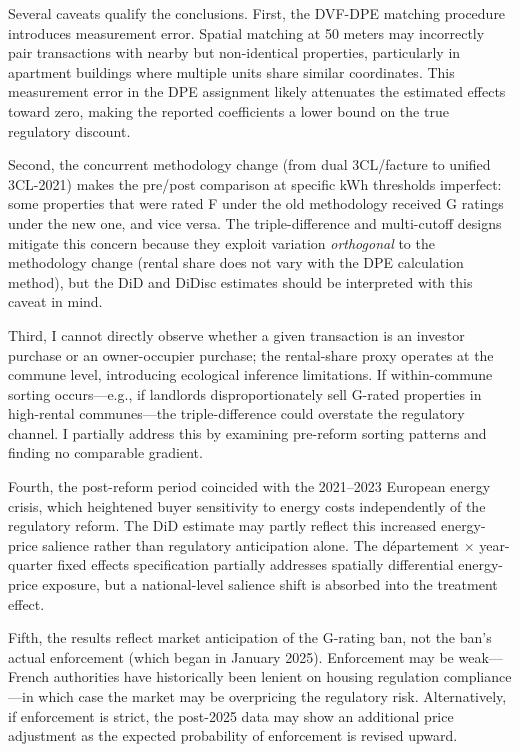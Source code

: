 \documentclass[12pt]{article}
\begin{document}
Several caveats qualify the conclusions. First, the DVF-DPE matching procedure introduces measurement error. Spatial matching at 50 meters may incorrectly pair transactions with nearby but non-identical properties, particularly in apartment buildings where multiple units share similar coordinates. This measurement error in the DPE assignment likely attenuates the estimated effects toward zero, making the reported coefficients a lower bound on the true regulatory discount.

Second, the concurrent methodology change (from dual 3CL/facture to unified 3CL-2021) makes the pre/post comparison at specific kWh thresholds imperfect: some properties that were rated F under the old methodology received G ratings under the new one, and vice versa. The triple-difference and multi-cutoff designs mitigate this concern because they exploit variation \textit{orthogonal} to the methodology change (rental share does not vary with the DPE calculation method), but the DiD and DiDisc estimates should be interpreted with this caveat in mind.

Third, I cannot directly observe whether a given transaction is an investor purchase or an owner-occupier purchase; the rental-share proxy operates at the commune level, introducing ecological inference limitations. If within-commune sorting occurs---e.g., if landlords disproportionately sell G-rated properties in high-rental communes---the triple-difference could overstate the regulatory channel. I partially address this by examining pre-reform sorting patterns and finding no comparable gradient.

Fourth, the post-reform period coincided with the 2021--2023 European energy crisis, which heightened buyer sensitivity to energy costs independently of the regulatory reform. The DiD estimate may partly reflect this increased energy-price salience rather than regulatory anticipation alone. The d\'epartement $\times$ year-quarter fixed effects specification partially addresses spatially differential energy-price exposure, but a national-level salience shift is absorbed into the treatment effect.

Fifth, the results reflect market anticipation of the G-rating ban, not the ban's actual enforcement (which began in January 2025). Enforcement may be weak---French authorities have historically been lenient on housing regulation compliance---in which case the market may be overpricing the regulatory risk. Alternatively, if enforcement is strict, the post-2025 data may show an additional price adjustment as the expected probability of enforcement is revised upward.
\end{document}
